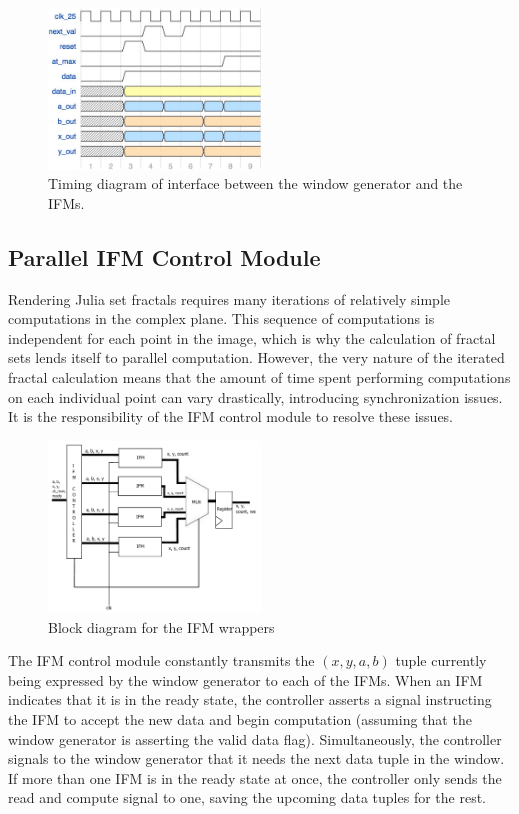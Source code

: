 \documentclass{article}
\begin{document}
\begin{figure}[H]
  \centering
    \includegraphics[width=160pt]{timing_diagrams/gen_ifm.pdf}
  \caption{Timing diagram of interface between the window generator
    and the IFMs.}
\end{figure}

\subsection{Parallel IFM Control Module}

Rendering Julia set fractals requires many iterations of relatively
simple computations in the complex plane. This sequence of
computations is independent for each point in the image, which is why
the calculation of fractal sets lends itself to parallel
computation. However, the very nature of the iterated fractal
calculation means that the amount of time spent performing computations on each individual point
can vary drastically, introducing synchronization issues. It is the responsibility of the
IFM control module to resolve these issues.

\begin{figure}[htb]
  \centering
    \includegraphics[width=160pt]{block_diagrams/ifmunit.pdf}
  \caption{Block diagram for the IFM wrappers}
\end{figure}


The IFM control module constantly transmits the $(x, y, a, b)$ tuple currently being expressed by the window generator to 
each of the IFMs. When an IFM indicates that it is in the ready state, the controller asserts a signal instructing the 
IFM to accept the new data and begin computation (assuming that the window generator is asserting the valid data flag).
Simultaneously, the controller signals to the window generator that it needs the next data tuple in the window. If more
than one IFM is in the ready state at once, the controller only sends the read and compute signal to one, saving the 
upcoming data tuples for the rest.
\end{document}
